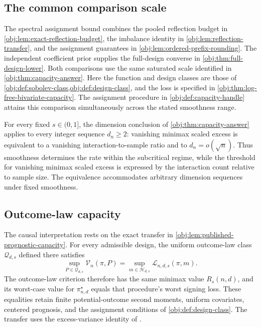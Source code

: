 \subsection{The common comparison scale}

The spectral assignment bound combines the pooled reflection budget in \cref{obj:lem:exact-reflection-budget}, the imbalance identity in \cref{obj:lem:reflection-transfer}, and the assignment guarantees in \cref{obj:lem:ordered-prefix-rounding}. The independent coefficient prior supplies the full-design converse in \cref{obj:thm:full-design-lower}. Both comparisons use the same saturated scale identified in \cref{obj:thm:capacity-answer}. Here the function and design classes are those of \cref{obj:def:sobolev-class,obj:def:design-class}, and the loss is specified in \cref{obj:thm:log-free-bivariate-capacity}. The assignment procedure in \cref{obj:def:capacity-handle} attains this comparison simultaneously across the stated smoothness range.

For every fixed \(s\in(0,1]\), the dimension conclusion of \cref{obj:thm:capacity-answer} applies to every integer sequence \(d_n\geq2\): vanishing minimax scaled excess is equivalent to a vanishing interaction-to-sample ratio and to \(d_n=o(\sqrt n)\). Thus smoothness determines the rate within the subcritical regime, while the threshold for vanishing minimax scaled excess is expressed by the interaction count relative to sample size. The equivalence accommodates arbitrary dimension sequences under fixed smoothness.

\subsection{Outcome-law capacity}

The causal interpretation rests on the exact transfer in \cref{obj:lem:published-prognostic-capacity}. For every admissible design, the uniform outcome-law class \(\mathcal Q_{d,s}\) defined there satisfies
\[
\sup_{P\in\mathcal Q_{d,s}}\mathcal V_n(\pi,P)
=
\sup_{m\in\mathcal H_{d,s}}\mathcal L_{n,d,s}(\pi,m).
\]
The outcome-law criterion therefore has the same minimax value \(R_s(n,d)\), and its worst-case value for \(\pi^\star_{n,d}\) equals that procedure's worst signing loss. These equalities retain finite potential-outcome second moments, uniform covariates, centered prognosis, and the assignment conditions of \cref{obj:def:design-class}. The transfer uses the excess-variance identity of \citet[Proposition 2.3, equation (2.4), under Assumption 2.1 and Definition 2.2]{Cytrynbaum2026Limits}.

